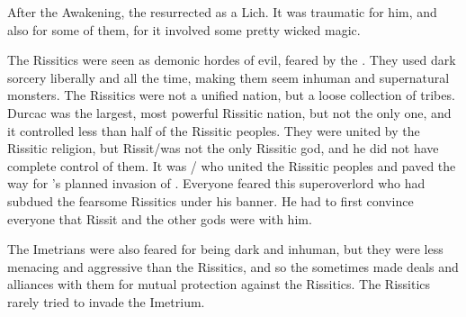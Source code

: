 After the Awakening, the \resphain resurrected \Semiza as a Lich.
It was traumatic for him, and also for some of them, for it involved some pretty wicked magic. 



The Rissitics were seen as demonic hordes of evil, feared by the \Velcadians.
They used dark sorcery liberally and all the time, making them seem inhuman and supernatural monsters.
The Rissitics were not a unified nation, but a loose collection of tribes.
Durcac was the largest, most powerful Rissitic nation, but not the only one, and it controlled less than half of the Rissitic peoples.
They were united by the Rissitic religion, but Rissit/\Secherdamon was not the only Rissitic god, and he did not have complete control of them.
It was \Narkiza/ who united the Rissitic peoples and paved the way for \Secherdamon's planned invasion of \Velcad.
Everyone feared this super\human overlord who had subdued the fearsome Rissitics under his banner. 
He had to first convince everyone that Rissit and the other gods were with him.

The Imetrians were also feared for being dark and inhuman, but they were less menacing and aggressive than the Rissitics, and so the \Velcadians sometimes made deals and alliances with them for mutual protection against the Rissitics.
The Rissitics rarely tried to invade the Imetrium.

